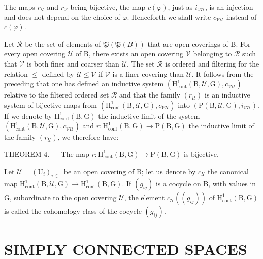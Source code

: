 The maps \(r_{\mathcal{U}}\) and \(r_{\mathcal{V}}\) being bijective, the map \(c(\varphi)\), just as \(i_{\mathcal{V}\mathcal{U}}\), is an injection and does not depend on the choice of \(\varphi\). Henceforth we shall write \(c_{\mathcal{V}\mathcal{U}}\) instead of \(c(\varphi)\).

Let \(\mathcal{R}\) be the set of elements of \(\mathfrak{P}(\mathfrak{P}(B))\) that are open coverings of B. For every open covering \(\mathcal{U}\) of B, there exists an open covering \(\mathcal{V}\) belonging to \(\mathcal{R}\) such that \(\mathcal{V}\) is both finer and coarser than \(\mathcal{U}\). The set \(\mathcal{R}\) is ordered and filtering for the relation \(\leqslant\) defined by \(\mathcal{U} \leqslant \mathcal{V}\) if \(\mathcal{V}\) is a finer covering than \(\mathcal{U}\). It follows from the preceding that one has defined an inductive system \((\mathrm{H}_{\mathrm{cont}}^{1}(\mathrm{B},\mathcal{U},\mathrm{G}),c_{\mathcal{V}\mathcal{U}})\) relative to the filtered ordered set \(\mathcal{R}\) and that the family \((r_{\mathcal{U}})\) is an inductive system of bijective maps from \((\mathrm{H}_{\mathrm{cont}}^{1}(\mathrm{B},\mathcal{U},\mathrm{G}),c_{\mathcal{V}\mathcal{U}})\) into \((\mathrm{P}(\mathrm{B},\mathcal{U},\mathrm{G}),i_{\mathcal{V}\mathcal{U}})\). If we denote by \(\mathrm{H}_{\mathrm{cont}}^{1}(\mathrm{B},\mathrm{G})\) the inductive limit of the system \((\mathrm{H}_{\mathrm{cont}}^{1}(\mathrm{B},\mathcal{U},\mathrm{G}),c_{\mathcal{V}\mathcal{U}})\) and \(r\colon \mathrm{H}_{\mathrm{cont}}^{1}(\mathrm{B},\mathrm{G})\to \mathrm{P}(\mathrm{B},\mathrm{G})\) the inductive limit of the family \((r_{\mathcal{U}})\), we therefore have:

THEOREM 4. --- The map \(r\colon \mathrm{H}_{\mathrm{cont}}^{1}(\mathrm{B},\mathrm{G})\to \mathrm{P}(\mathrm{B},\mathrm{G})\) is bijective.

Let \(\mathcal{U} = (\mathrm{U}_i)_{i\in \mathrm{I}}\) be an open covering of B; let us denote by \(c_{\mathcal{U}}\) the canonical map \(\mathrm{H}_{\mathrm{cont}}^{1}(\mathrm{B},\mathcal{U},\mathrm{G})\to \mathrm{H}_{\mathrm{cont}}^{1}(\mathrm{B},\mathrm{G})\). If \((g_{ij})\) is a cocycle on B, with values in G, subordinate to the open covering \(\mathcal{U}\), the element \(c_{\mathcal{U}}((g_{ij}))\) of \(\mathrm{H}_{\mathrm{cont}}^{1}(\mathrm{B},\mathrm{G})\) is called the cohomology class of the cocycle \((g_{ij})\).

\section{SIMPLY CONNECTED SPACES}

